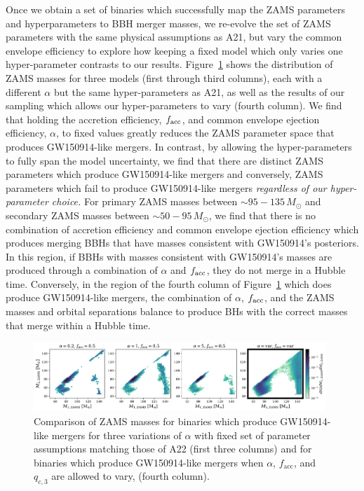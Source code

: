 \documentclass[twocolumn]{aastex631}
\newcommand{\kw}[1]{{\color{rb4}[KW: #1 ]}}
\newcommand{\kb}[1]{\textcolor{pink}{#1}}
\begin{document}
Once we obtain a set of binaries which successfully map the ZAMS parameters and hyperparameters to BBH merger masses, 
we re-evolve the set of ZAMS parameters with the same physical assumptions as A21, but vary the common envelope efficiency 
to explore how keeping a fixed model which only varies one hyper-parameter contrasts to our results. 
Figure~\ref{fig:compare_fixed_variable} shows the distribution of ZAMS masses for three models (first through third columns), 
each with a different $\alpha$ but the same hyper-parameters as A21, 
as well as the results of our sampling which allows our hyper-parameters to vary (fourth column). We find that holding the accretion 
efficiency, $f_{\rm{acc}}$, and common envelope ejection efficiency, $\alpha$, to fixed values greatly reduces the ZAMS parameter space 
that produces GW150914-like mergers. In contrast, by allowing the hyper-parameters to fully span the model uncertainty, we 
find that there are distinct ZAMS parameters which produce GW150914-like mergers and conversely, ZAMS parameters which 
fail to produce GW150914-like mergers \emph{regardless of our hyper-parameter choice.} For primary ZAMS masses between 
$\sim95-135\,M_{\odot}$ and secondary ZAMS masses between $\sim50-95\,M_{\odot}$, we find that there is no combination of accretion
efficiency and common envelope ejection efficiency which produces merging BBHs that have masses consistent with GW150914's posteriors.
In this region, if BBHs with masses consistent with GW150914's masses are produced through a combination of $\alpha$ and 
$f_{\rm{acc}}$, they do not merge in a Hubble time. Conversely, in the region of the fourth column of Figure~\ref{fig:compare_fixed_variable}
which does produce GW150914-like mergers, the combination of $\alpha$, $f_{\rm{acc}}$, and the ZAMS masses and orbital separations 
balance to produce BHs with the correct masses that merge within a Hubble time.


\begin{figure}
    \includegraphics[width=0.98\textwidth]{static/compare_fixed_variable.png}
    \caption{Comparison of ZAMS masses for binaries which produce GW150914-like mergers for three variations of $\alpha$
     with fixed set of parameter assumptions matching those of A22 (first three columns) and for binaries which produce 
     GW150914-like mergers when $\alpha$, $f_{\mathrm{acc}}$, and $q_{c,3}$ are allowed to vary, (fourth column).}
    \label{fig:compare_fixed_variable}
\end{figure}
\end{document}
